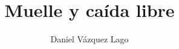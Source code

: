\documentclass[10pt,a4paper]{article}
\author{Daniel Vázquez Lago}
\begin{document}
\title{Muelle y caída libre}
\maketitle \newpage
\tableofcontents \newpage
\end{document}
